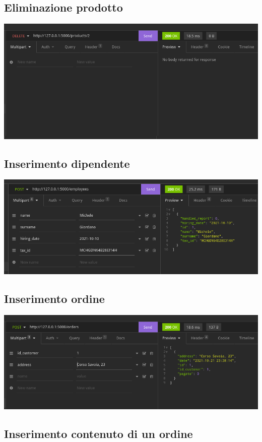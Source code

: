 \subsection{Eliminazione prodotto}

\includegraphics[scale=0.45]{images/cancellazione_prodotto.png}

\subsection{Inserimento dipendente}

\includegraphics[scale=0.45]{images/inserimento_dipendente.png}

\subsection{Inserimento ordine}
\includegraphics[scale=0.45]{images/ordine.png}

\subsection{Inserimento contenuto di un ordine}

